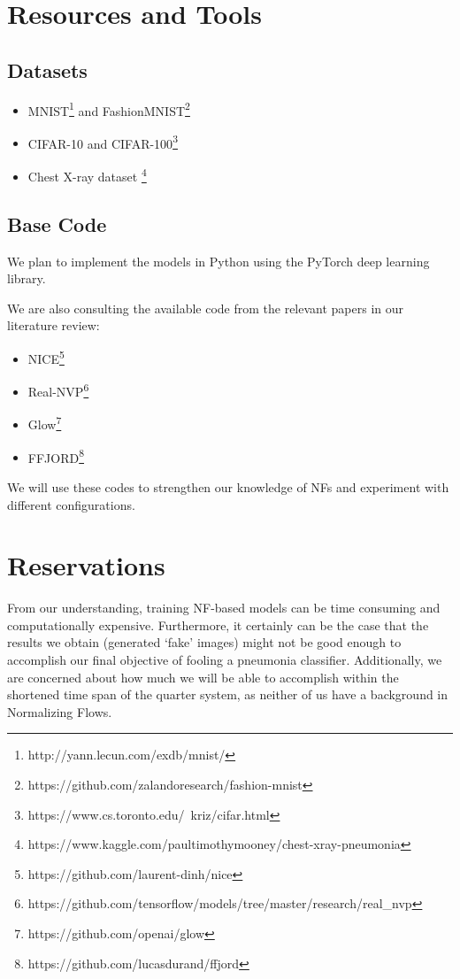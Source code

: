 \documentclass{article}
\begin{document}
\section{Resources and Tools}

\subsection{Datasets} 

\begin{itemize} 
	\item MNIST\footnote{http://yann.lecun.com/exdb/mnist/} and
		FashionMNIST\footnote{https://github.com/zalandoresearch/fashion-mnist} 
	\item CIFAR-10 and CIFAR-100\footnote{https://www.cs.toronto.edu/~kriz/cifar.html}
	\item Chest X-ray dataset
\footnote{https://www.kaggle.com/paultimothymooney/chest-xray-pneumonia}
\end{itemize} 

\subsection{Base Code}

We plan to implement the models in Python using the PyTorch deep learning
library.

We are also consulting the available code from the relevant papers in our
literature review: 
\begin{itemize} 
	\item NICE\footnote{https://github.com/laurent-dinh/nice} 
	\item Real-NVP\footnote{https://github.com/tensorflow/models/tree/master/research/real\_nvp}
	\item Glow\footnote{https://github.com/openai/glow} 
	\item FFJORD\footnote{https://github.com/lucasdurand/ffjord} 
\end{itemize}

We will use these codes to strengthen our knowledge of NFs and experiment with
different configurations. 

\section{Reservations} 
From our understanding, training NF-based models can be
time consuming and computationally expensive. Furthermore, it certainly can be
the case that the results we obtain (generated `fake' images) might not be good
enough to accomplish our final objective of fooling a pneumonia classifier.
Additionally, we are concerned about how much we will be able to accomplish
within the shortened time span of the quarter system, as neither of us have a
background in Normalizing Flows. 
\end{document}
